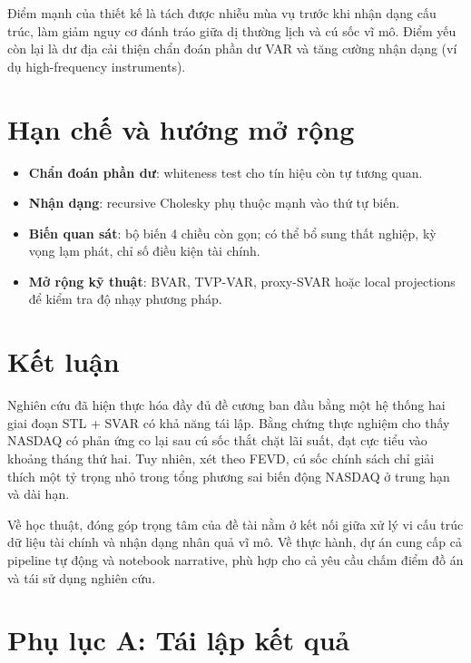 \documentclass[12pt,a4paper]{article}
\begin{document}
Điểm mạnh của thiết kế là tách được nhiễu mùa vụ trước khi nhận dạng cấu trúc, làm giảm nguy cơ đánh tráo giữa dị thường lịch và cú sốc vĩ mô. Điểm yếu còn lại là dư địa cải thiện chẩn đoán phần dư VAR và tăng cường nhận dạng (ví dụ high-frequency instruments).

\section{Hạn chế và hướng mở rộng}

\begin{itemize}[leftmargin=1.5em]
    \item \textbf{Chẩn đoán phần dư}: whiteness test cho tín hiệu còn tự tương quan.
    \item \textbf{Nhận dạng}: recursive Cholesky phụ thuộc mạnh vào thứ tự biến.
    \item \textbf{Biến quan sát}: bộ biến 4 chiều còn gọn; có thể bổ sung thất nghiệp, kỳ vọng lạm phát, chỉ số điều kiện tài chính.
    \item \textbf{Mở rộng kỹ thuật}: BVAR, TVP-VAR, proxy-SVAR hoặc local projections để kiểm tra độ nhạy phương pháp.
\end{itemize}

\section{Kết luận}

Nghiên cứu đã hiện thực hóa đầy đủ đề cương ban đầu bằng một hệ thống hai giai đoạn STL + SVAR có khả năng tái lập. Bằng chứng thực nghiệm cho thấy NASDAQ có phản ứng co lại sau cú sốc thắt chặt lãi suất, đạt cực tiểu vào khoảng tháng thứ hai. Tuy nhiên, xét theo FEVD, cú sốc chính sách chỉ giải thích một tỷ trọng nhỏ trong tổng phương sai biến động NASDAQ ở trung hạn và dài hạn.

Về học thuật, đóng góp trọng tâm của đề tài nằm ở kết nối giữa xử lý vi cấu trúc dữ liệu tài chính và nhận dạng nhân quả vĩ mô. Về thực hành, dự án cung cấp cả pipeline tự động và notebook narrative, phù hợp cho cả yêu cầu chấm điểm đồ án và tái sử dụng nghiên cứu.

\newpage
\appendix
\section{Phụ lục A: Tái lập kết quả}
\end{document}
